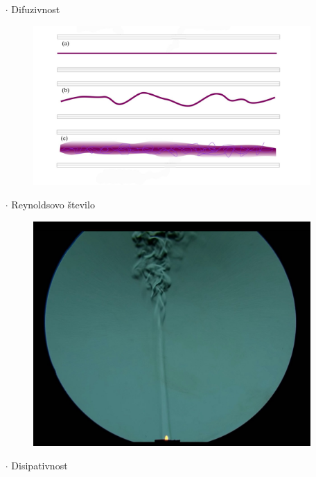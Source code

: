 \documentclass{beamer}
\begin{document}
\begin{frame}
\begin{itemize}
    \item[\Large$\cdot$] Difuzivnost
    \begin{figure}[h!]
        \centering
      \includegraphics[scale=0.19]{slike/difus.jpeg}
      \end{figure}
\end{itemize}
\end{frame}
\begin{frame}
\begin{itemize}
    \item[\Large$\cdot$] Reynoldsovo število
    \begin{figure}[h]
        \centering
      \includegraphics[scale=0.19]{slike/Reynolds.jpeg}
      \end{figure}
    \pause
    \item[\Large$\cdot$] Disipativnost
\end{itemize}
\end{frame}
\end{document}
